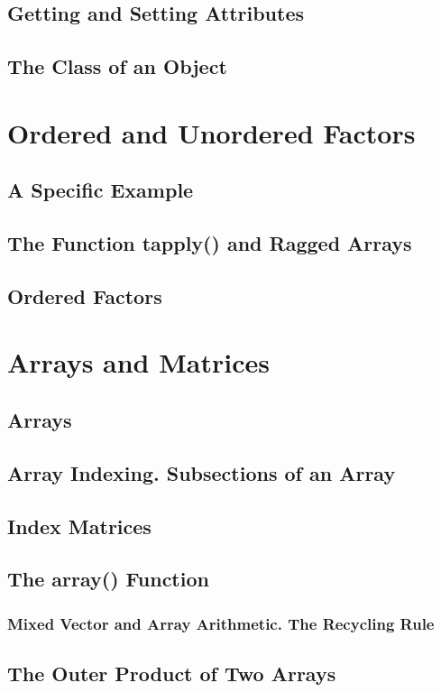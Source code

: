 \documentclass{article}
\begin{document}
\subsection{Getting and Setting Attributes}
\subsection{The Class of an Object}

\section{Ordered and Unordered Factors}
\subsection{A Specific Example}
\subsection{The Function tapply() and Ragged Arrays}
\subsection{Ordered Factors}

\section{Arrays and Matrices}
\subsection{Arrays}
\subsection{Array Indexing. Subsections of an Array}
\subsection{Index Matrices}
\subsection{The array() Function}
\subsubsection{Mixed Vector and Array Arithmetic. The Recycling Rule}
\subsection{The Outer Product of Two Arrays}
\end{document}
